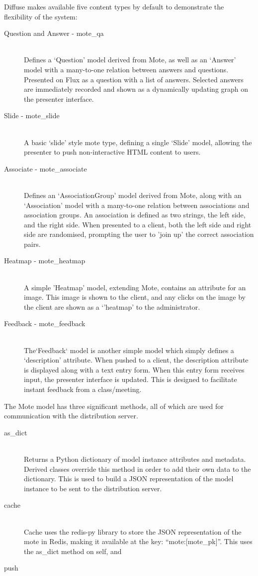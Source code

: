 \documentclass[a4papert,11pt,notitlepage]{ltxdoc}
\begin{document}
Diffuse makes available five content types by default to demonstrate the flexibility of the system:
\begin{description}
\item[Question and Answer - mote\_qa] \hfill \\
Defines a `Question' model derived from Mote, as well as an `Answer' model with a many-to-one relation between answers and questions. Presented on Flux as a question with a list of answers. Selected answers are immediately recorded and shown as a dynamically updating graph on the presenter interface.
\item[Slide - mote\_slide] \hfill \\
A basic `slide' style mote type, defining a single `Slide' model, allowing the presenter to push non-interactive HTML content to users.
\item[Associate - mote\_associate] \hfill \\
Defines an `AssociationGroup' model derived from Mote, along with an `Association' model with a many-to-one relation between associations and association groups. An association is defined as two strings, the left side, and the right side. When presented to a client, both the left side and right side are randomised, prompting the user to 'join up' the correct association pairs.
\item[Heatmap - mote\_heatmap] \hfill \\
A simple 'Heatmap' model, extending Mote, contains an attribute for an image. This image is shown to the client, and any clicks on the image by the client are shown as a `'heatmap' to the administrator.
\item[Feedback - mote\_feedback] \hfill \\
The`Feedback` model is another simple model which simply defines a `description' attribute. When pushed to a client, the description attribute is displayed along with a text entry form. When this entry form receives input, the presenter interface is updated. This is designed to facilitate instant feedback from a class/meeting.
\end{description}

The Mote model has three significant methods, all of which are used for communication with the distribution server.
\begin{description}
\item[as\_dict] \hfill \\
Returns a Python dictionary of model instance attributes and metadata. Derived classes override this method in order to add their own data to the dictionary. This is used to build a JSON representation of the model instance to be sent to the distribution server.
\item[cache] \hfill \\
Cache uses the redis-py\cite{redispy:web} library to store the JSON representation of the mote in Redis, making it available at the key: ``mote:{[}mote\_pk{]}''. This uses the as\_dict method on self, and 
\item[push] \hfill \\
\end{description}
\end{document}
